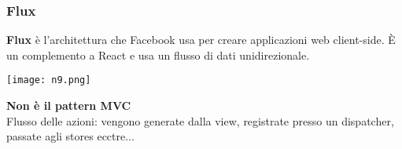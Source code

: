 \begin{frame}
\frametitle{Flux}
	\par
  	\textbf{Flux} è l’architettura che Facebook usa per creare applicazioni web client-side. È un complemento a React e usa un flusso di dati unidirezionale.\\
	\begin{flushleft}
		\texttt{[image: n9.png]}	
	\end{flushleft}	
	\textbf{Non è il pattern MVC}\\
	Flusso delle azioni: vengono generate dalla view, registrate presso un dispatcher, passate agli stores ecctre...	
\end{frame}



